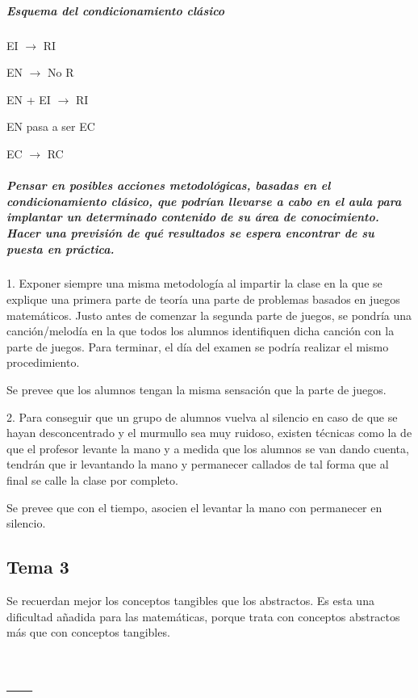 \documentclass[palatino,nochap]{apuntesURJC}
\begin{document}
\paragraph{Esquema del condicionamiento clásico}

EI $\to$ RI

EN $\to$ No R

EN + EI $\to$ RI

EN pasa a ser EC

EC $\to$ RC

\paragraph{Pensar en posibles acciones metodológicas, basadas en el condicionamiento clásico, que podrían llevarse a cabo en el aula para implantar un determinado contenido de su área de conocimiento. Hacer una previsión de qué resultados se espera encontrar de su puesta en práctica.}



1. Exponer siempre una misma metodología al impartir la clase en la que se explique una primera parte de teoría una parte de problemas basados en juegos matemáticos. Justo antes de comenzar la segunda parte de juegos, se pondría una canción/melodía en la que todos los alumnos identifiquen dicha canción con la parte de juegos.
Para terminar, el día del examen se podría realizar el mismo procedimiento. 

Se prevee que los alumnos tengan la misma sensación que la parte de juegos. 

2. Para conseguir que un grupo de alumnos vuelva al silencio en caso de que se hayan desconcentrado y el murmullo sea muy ruidoso, existen técnicas como la de que el profesor levante la mano y a medida que los alumnos se van dando cuenta, tendrán que ir levantando la mano y permanecer callados de tal forma que al final se calle la clase por completo.

Se prevee que con el tiempo, asocien el levantar la mano con permanecer en silencio.


\section{Tema 3}

Se recuerdan mejor los conceptos tangibles que los abstractos. 
%
Es esta una dificultad añadida para las matemáticas, porque trata con conceptos abstractos más que con conceptos tangibles.


\appendix

\chapter{---}


\printindex
\end{document}
